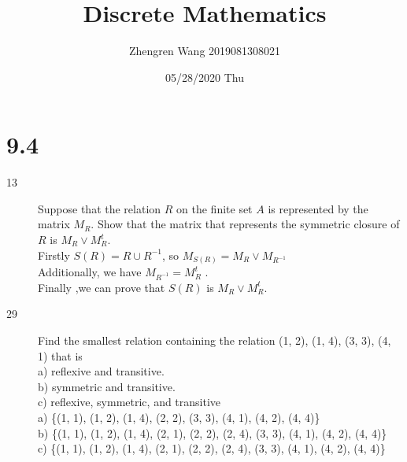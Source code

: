 \documentclass[UTF8]{article}
\title{Discrete Mathematics}
\author{Zhengren Wang 2019081308021}
\date{05/28/2020 Thu }
\begin{document}
\maketitle

\part{9.4}
\begin{description}
    \item[13]Suppose that the relation $R$ on the finite set $A$ is represented by the matrix $M_R$. Show that the matrix that represents the symmetric closure of $R$ is $M_R \lor M^t_R$. \\
        
        Firstly $S(R)=R \cup R^{-1}$, so $M_{S(R)}=M_R \lor M_{R^{-1}}$   \\
        Additionally, we have $M_{R^{-1}}=M^t_R$ .   \\
        Finally ,we can prove that $S(R)$ is $M_R \lor M^t_R$. \\


    \item[29]Find the smallest relation containing the relation {(1, 2), (1, 4), (3, 3), (4, 1)} that is  \\
        a) reflexive and transitive.           \\
        b) symmetric and transitive.           \\
        c) reflexive, symmetric, and transitive\\

        a) \{(1, 1), (1, 2), (1, 4), (2, 2), (3, 3), (4, 1), (4, 2), (4, 4)\}                 \\
        b) \{(1, 1), (1, 2), (1, 4), (2, 1), (2, 2), (2, 4), (3, 3), (4, 1), (4, 2), (4, 4)\} \\
        c) \{(1, 1), (1, 2), (1, 4), (2, 1), (2, 2), (2, 4), (3, 3), (4, 1), (4, 2), (4, 4)\} \\

\end{description}
\end{document}

